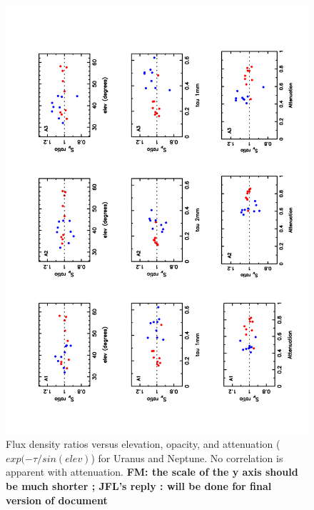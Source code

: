 \begin{figure}[p]
\begin{center}
  \includegraphics[clip, angle=-90, scale=0.6]{Figures/Ura_Nep_ratio_vs_elev_tau_attenuation_r9_r10.pdf}
  \caption[Flux density stability checks]{Flux density ratios versus elevation, opacity, and attenuation ($exp(-\tau/sin(elev)$) for Uranus and Neptune.
    No correlation is apparent with attenuation. {\bf FM: the scale of
      the y axis should be much shorter  ;   JFL's reply  : will be done for final
    version of document}}
\label{fig:ratio_vs_att}
\end{center}
\end{figure}


